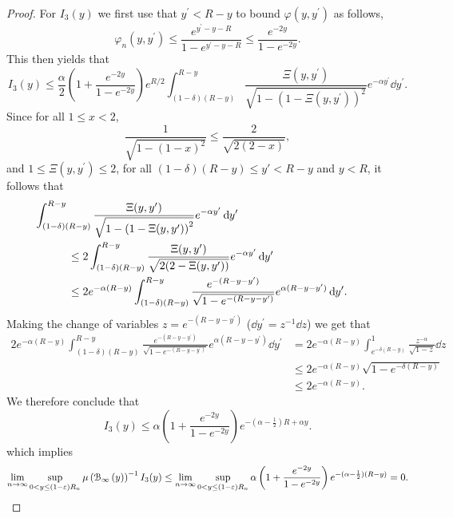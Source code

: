 \begin{proof}
For $I_3(y)$ we first use that $y^\prime < R - y$ to bound $\varphi(y,y^\prime)$ as follows,
\[
	\varphi_n(y,y^\prime) \le \frac{e^{y^\prime - y - R}}{1 - e^{y^\prime - y - R}} \le \frac{e^{-2y}}{1 - e^{-2y}}.
\]
This then yields that
\[
	I_3(y) \le \frac{\alpha}{2}\left(1 + \frac{e^{-2y}}{1 - e^{-2y}}\right)e^{R/2}
	\int_{(1-\delta)(R- y)}^{R - y} \frac{ \Xi(y,y^\prime)}{\sqrt{1 - \left(1 - \Xi(y,y^\prime)\right)^2}}
	e^{-\alpha y^\prime} \dd y^\prime.
\]
Since for all $1 \le x < 2$,
\[
	\frac{1}{\sqrt{1- (1-x)^2}} \le \frac{2}{\sqrt{2(2-x)}},
\]
and $1 \le \Xi(y,y^\prime) \le 2$, for all $(1-\delta)(R -y) \le y\prime < R-y$ and $y < R$, it follows that
\begin{align*}
	&\hspace{-30pt}\int_{(1-\delta)(R- y)}^{R - y} \frac{ \Xi(y,y^\prime)}{\sqrt{1 - \left(1 - \Xi(y,y^\prime)\right)^2}}
		e^{-\alpha y^\prime} \dd y^\prime \\
	&\le 2 \int_{(1-\delta)(R- y)}^{R - y} \frac{\Xi(y,y^\prime)}{\sqrt{2(2-\Xi(y,y^\prime))}} e^{-\alpha y^\prime} 
		\dd y^\prime \\
	&\le 2 e^{-\alpha(R - y)} \int_{(1-\delta)(R- y)}^{R - y} 
		\frac{e^{-(R - y - y^\prime)}}{\sqrt{1 - e^{-(R - y - y^\prime)}}} e^{\alpha (R - y - y^\prime)} \dd y^\prime.
\end{align*}
Making the change of variables $z = e^{-(R - y - y^\prime)}$ ($\dd y^\prime = z^{-1} \dd z$) we get that
\begin{align*}
	2 e^{-\alpha(R - y)} \int_{(1-\delta)(R- y)}^{R - y} 
			\frac{e^{-(R - y - y^\prime)}}{\sqrt{1 - e^{-(R - y - y^\prime)}}} e^{\alpha (R - y - y^\prime)} \dd y^\prime
	&= 2 e^{-\alpha(R - y)} \int_{e^{-\delta (R - y)}}^{1} \frac{z^{-\alpha}}{\sqrt{1 - z}} \dd z\\
	&\le 2 e^{-\alpha(R - y)} \sqrt{1 - e^{-\delta (R - y)}}\\
	&\le 2 e^{-\alpha (R -y)}.
\end{align*}
We therefore conclude that
\[
	I_3(y) \le \alpha \left(1 + \frac{e^{-2y}}{1 - e^{-2y}}\right)e^{-(\alpha -\frac{1}{2})R + \alpha y}.
\]
which implies
\[
	\lim_{n \to \infty} \sup_{0 < y \le (1-\varepsilon)R_n} \mu\left({\mathcal B}_{\infty}\left(y\right)\right)^{-1} I_3(y) 
	\le \lim_{n \to \infty} \sup_{0 < y \le (1-\varepsilon)R_n} \alpha \left(1 + \frac{e^{-2y}}{1 - e^{-2y}}\right) e^{-(\alpha - \frac{1}{2})(R - y)} = 0.
\]


\end{proof}
